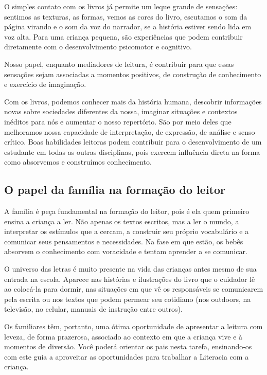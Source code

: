 \documentclass[11pt]{extarticle}
\begin{document}
O simples contato com os livros já permite um leque grande de sensações: 
sentimos as texturas, as formas, vemos as cores do livro, escutamos o som da página 
virando e o som da voz do narrador, se a história estiver sendo lida em voz alta. Para uma 
criança pequena, são experiências que podem contribuir diretamente com o desenvolvimento psicomotor 
e cognitivo. 

Nosso papel, enquanto mediadores de leitura, é contribuir para que essas 
sensações sejam associadas a momentos positivos, de construção de 
conhecimento e exercício de imaginação. 

Com os livros, podemos conhecer mais da história humana, descobrir informações 
novas sobre sociedades diferentes da nossa, imaginar situações e contextos inéditos 
para nós e aumentar o nosso repertório. São por meio deles que melhoramos nossa 
capacidade de interpretação, de expressão, de análise e senso crítico. Boas habilidades 
leitoras podem contribuir para o desenvolvimento de um estudante em todas as outras 
disciplinas, pois exercem influência direta na forma como absorvemos e 
construímos conhecimento.


\subsection{O papel da família na formação do leitor}
A família é peça fundamental na formação do leitor, pois é ela quem primeiro 
ensina a criança a ler. Não apenas os textos escritos, mas a ler o mundo, a 
interpretar os estímulos que a cercam, a construir seu próprio vocabulário e a 
comunicar seus pensamentos e necessidades. Na fase em que estão, os bebês 
absorvem o conhecimento com voracidade e tentam aprender a se comunicar. 

O universo das letras é muito presente na vida das crianças antes mesmo de sua 
entrada na escola. Aparece nas histórias e ilustrações do livro que o cuidador 
lê ao colocá-la para dormir, nas situações em que vê os responsáveis se comunicarem 
pela escrita ou nos textos que podem permear seu cotidiano (nos outdoors, na 
televisão, no celular, manuais de instrução entre outros). 

Os familiares têm, 
portanto, uma ótima oportunidade de apresentar a leitura com leveza, de forma 
prazerosa, associado ao contexto em que a criança vive e à momentos de diversão. 
Você poderá orientar os pais nesta tarefa, ensinando-os com este guia a aproveitar 
as oportunidades para trabalhar a Literacia com a criança.
\end{document}
